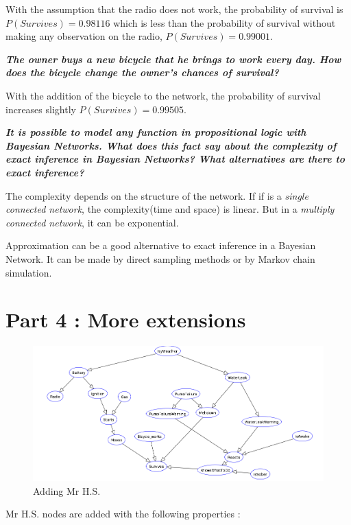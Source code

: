 \vspace{1em}
With the assumption that the radio does not work, the probability of survival
is \textbf{$P(Survives)=0.98116$} which is less than the probability of survival without making any
observation on the radio, \textbf{$P(Survives)=0.99001$}.

\textit{\textbf{The owner buys a new bicycle that he brings to work every day.
How does the bicycle change the owner's chances of survival?}}

\vspace{1em}
With the addition of the bicycle to the network, the probability of survival
increases slightly $P(Survives)=0.99505$.

\textit{\textbf{It is possible to model any function in propositional
logic with Bayesian Networks. What does this fact say about the complexity
of exact inference in Bayesian Networks? What alternatives are there
to exact inference?}}

The complexity depends on the structure of the network. If if is a \textit{single
connected network}, the complexity(time and space) is linear. But in a
\textit{multiply connected network}, it can be exponential.

Approximation can be a good alternative to exact inference in a Bayesian Network.
It can be made by direct sampling methods or by Markov chain simulation.


\newpage
\thispagestyle{empty}
\section*{Part 4 : More extensions}

\begin{figure}[h]
    \centering
      \includegraphics[width=0.83\linewidth]{./images/lab3.png}
    \caption{Adding Mr H.S.\label{graph}}
\end{figure}

Mr H.S. nodes are added with the following properties :


